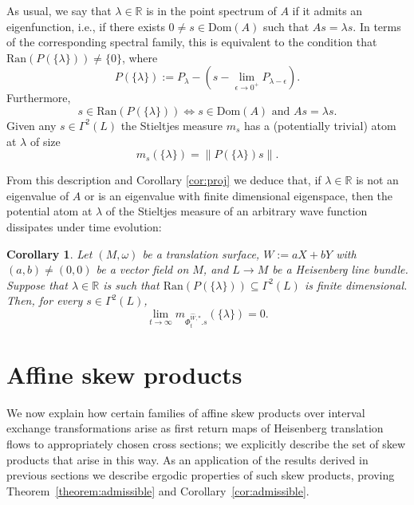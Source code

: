 \documentclass{amsart}
\newtheorem{corollary}[theorem]{Corollary}
\theoremstyle{definition}
\theoremstyle{remark}
\numberwithin{equation}{section}
\newcommand{\wW}{\widehat{W}}
\newcommand{\<}{{\langle}}
\renewcommand{\>}{{\rangle}}
\begin{document}
As usual, we say that $\lambda \in \mathbb{R}$ is in the point spectrum of $A$ if it admits an eigenfunction, i.e., if there exists $0 \neq s \in \mathrm{Dom}(A)$ such that $As = \lambda s$. In terms of the corresponding spectral family, this is equivalent to the condition that $\mathrm{Ran}(P(\{\lambda\})) \neq \{0\}$, where 
\[
P(\{\lambda\}) := P_\lambda - \left(s -\lim_{\epsilon\to 0^+} P_{\lambda-\epsilon}\right).
\]
Furthermore,
\[
s \in \mathrm{Ran}(P(\{\lambda\})) \Longleftrightarrow s \in \mathrm{Dom}(A) \text{ and } As = \lambda s.
\]
Given any $s \in \Gamma^2(L)$ the Stieltjes measure $m_s$ has a (potentially trivial) atom at $\lambda$ of size
\[
m_s(\{\lambda\}) = \|P(\{\lambda\}) s\|.
\]

From this description and Corollary \ref{cor:proj} we deduce that, if $\lambda \in \mathbb{R}$ is not an eigenvalue of $A$ or is an eigenvalue with finite dimensional eigenspace, then the potential atom at $\lambda$ of the Stieltjes measure of an arbitrary wave function dissipates under time evolution:

\begin{corollary}
    \label{cor:spec}
    Let $(M,\omega)$ be a translation surface, $W := aX+bY$ with $(a,b) \not = (0,0)$ be a vector field on $M$, and $L \to M$ be a Heisenberg line bundle. Suppose that $\lambda \in \mathbb{R}$ is such that $\mathrm{Ran}(P(\{\lambda\})) \subseteq \Gamma^2(L)$ is finite dimensional. Then, for every $s \in \Gamma^2(L)$,
    \[
    \lim_{t \to \infty} m_{\Phi_t^{\wW,*}.s}(\{\lambda\}) = 0.
    \]
\end{corollary}


\section{Affine skew products}\label{sec:affineskewiet}

We now explain how certain families of affine skew products over interval exchange transformations arise as first return maps of Heisenberg translation flows to appropriately chosen cross sections; we explicitly describe the set of skew products that arise in this way. As an application of the results derived in previous sections we describe ergodic properties of such skew products, proving Theorem~\ref{theorem:admissible} and Corollary~\ref{cor:admissible}.
\end{document}
